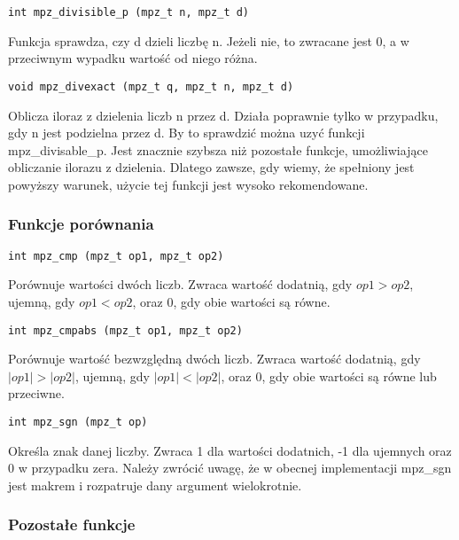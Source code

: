\documentclass[twoside,a4paper]{book}
\begin{document}
\begin{lstlisting}
int mpz_divisible_p (mpz_t n, mpz_t d)
\end{lstlisting}

Funkcja sprawdza, czy d dzieli liczbę n. Jeżeli nie, to zwracane jest 0, a w przeciwnym wypadku wartość od niego różna.

\begin{lstlisting}
void mpz_divexact (mpz_t q, mpz_t n, mpz_t d)
\end{lstlisting}

Oblicza iloraz z dzielenia liczb n przez d. Działa poprawnie tylko w przypadku, gdy n jest podzielna przez d. By to sprawdzić można uzyć funkcji mpz\_divisable\_p. Jest znacznie szybsza niż pozostałe funkcje, umożliwiające obliczanie ilorazu z dzielenia. Dlatego zawsze, gdy wiemy, że spełniony jest powyższy warunek, użycie tej funkcji jest wysoko rekomendowane.

\subsubsection{Funkcje porównania}

\begin{lstlisting}
int mpz_cmp (mpz_t op1, mpz_t op2)
\end{lstlisting}

Porównuje wartości dwóch liczb. Zwraca wartość dodatnią, gdy $op1>op2$, ujemną, gdy $op1<op2$, oraz 0, gdy obie wartości są równe.

\begin{lstlisting}
int mpz_cmpabs (mpz_t op1, mpz_t op2)
\end{lstlisting}

Porównuje wartość bezwzględną dwóch liczb. Zwraca wartość dodatnią, gdy $|op1|>|op2|$, ujemną, gdy $|op1|<|op2|$, oraz 0, gdy obie wartości są równe lub przeciwne.

\begin{lstlisting}
int mpz_sgn (mpz_t op)
\end{lstlisting}

Określa znak danej liczby. Zwraca 1 dla wartości dodatnich, -1 dla ujemnych oraz 0 w przypadku zera. Należy zwrócić uwagę, że w obecnej implementacji mpz\_sgn jest makrem i rozpatruje dany argument wielokrotnie.

\subsubsection{Pozostałe funkcje}
\end{document}
